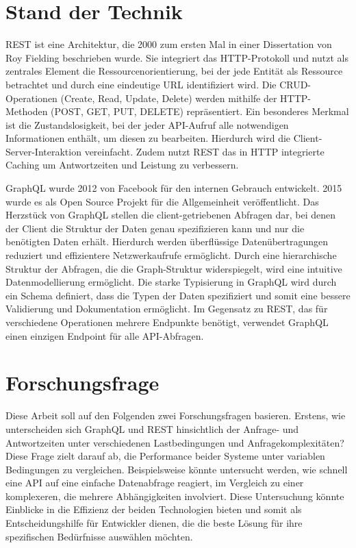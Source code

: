 \documentclass[a4paper, 12pt]{article}
\begin{document}
\section{Stand der Technik}
REST ist eine Architektur, die 2000 zum ersten Mal in einer Dissertation von Roy Fielding beschrieben wurde. Sie integriert das HTTP-Protokoll und nutzt als zentrales Element die Ressourcenorientierung, bei der jede Entität als Ressource betrachtet und durch eine eindeutige URL identifiziert wird. Die CRUD-Operationen (Create, Read, Update, Delete) werden mithilfe der HTTP-Methoden (POST, GET, PUT, DELETE) repräsentiert. Ein besonderes Merkmal ist die Zustandslosigkeit, bei der jeder API-Aufruf alle notwendigen Informationen enthält, um diesen zu bearbeiten. Hierdurch wird die Client-Server-Interaktion vereinfacht. Zudem nutzt REST das in HTTP integrierte Caching um Antwortzeiten und Leistung zu verbessern. \citep{Fielding2000}  \citep{graphqlreplacerest}


GraphQL wurde 2012 von Facebook für den internen Gebrauch entwickelt. 2015 wurde es als Open Source Projekt für die Allgemeinheit veröffentlicht. Das Herzstück von GraphQL stellen die client-getriebenen Abfragen dar, bei denen der Client die Struktur der Daten genau spezifizieren kann und nur die benötigten Daten erhält. Hierdurch werden überflüssige Datenübertragungen reduziert und effizientere Netzwerkaufrufe ermöglicht. Durch eine hierarchische Struktur der Abfragen, die die Graph-Struktur widerspiegelt, wird eine intuitive Datenmodellierung ermöglicht. Die starke Typisierung in GraphQL wird durch ein Schema definiert, dass die Typen der Daten spezifiziert und somit eine bessere Validierung und Dokumentation ermöglicht. Im Gegensatz zu REST, das für verschiedene Operationen mehrere Endpunkte benötigt, verwendet GraphQL einen einzigen Endpoint für alle API-Abfragen.  \citep{graphql}   \citep{graphqlreplacerest}
\newpage
\section{Forschungsfrage}
Diese Arbeit soll auf den Folgenden zwei Forschungsfragen basieren. \newline
Erstens, wie unterscheiden sich GraphQL und REST hinsichtlich der Anfrage- und Antwortzeiten unter verschiedenen Lastbedingungen und Anfragekomplexitäten? Diese Frage zielt darauf ab, die Performance beider Systeme unter variablen Bedingungen zu vergleichen. Beispielsweise könnte untersucht werden, wie schnell eine API auf eine einfache Datenabfrage reagiert, im Vergleich zu einer komplexeren, die mehrere Abhängigkeiten involviert. Diese Untersuchung könnte Einblicke in die Effizienz der beiden Technologien bieten und somit als Entscheidungshilfe für Entwickler dienen, die die beste Lösung für ihre spezifischen Bedürfnisse auswählen möchten.
\end{document}
